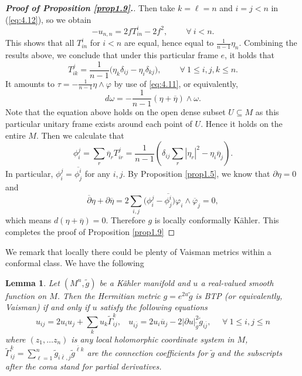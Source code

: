 \documentclass{amsart}
\numberwithin{equation}{section}
\newtheorem{lemma}  [theorem]     {Lemma}
\theoremstyle{definition}
\renewcommand{\1}{\mathds{1}}
\renewcommand{\>}{\rightarrow}
\begin{document}
\begin{proof}[{\bf Proof of Proposition \ref{prop1.9}.}]
Then take $k=\ell =n$ and $i=j<n$ in (\ref{eq:4.12}), so we obtain
$$ -u_{n,n}= 2f T^i_{in} - 2f ^2,\qquad \ \forall \ i<n.$$
This shows that all $T^i_{in}$ for $i<n$ are equal, hence equal to $\frac{1}{n-1}\eta_n$.
Combining the results above, we conclude that under this particular frame $e$, it holds that
\begin{equation}
T^j_{ik} = \frac{1}{n-1} \big( \eta_k \delta_{ij} - \eta_i \delta_{kj}  \big),\qquad  \ \forall \ 1\leq i,j,k\leq n.   \label{eq:4.14}
\end{equation}
It amounts to $\tau= -\frac{1}{n-1} \eta \wedge \varphi$ by use of \eqref{eq:4.11}, or equivalently,
\[d \omega = -\frac{1}{n-1}(\eta + \overline{\eta}) \wedge \omega.\]
Note that the equation above holds on the open dense subset $U\subseteq M$ as this particular unitary frame exists around each point of $U$.
Hence it holds on the entire $M$. Then we calculate that
$$ \phi_i^j = \sum_r \overline{\eta}_r T^j_{ir} = \frac{1}{n-1}\left( \delta_{ij} \sum_r |\eta_r|^2 - \eta_i \overline{\eta}_j \right).$$
In particular, $\phi_i^j = \overline{\phi^i_j}$ for any $i,j$. By Proposition \ref{prop1.5}, we know that $\partial \eta =0$ and
$$ \overline{\partial }\eta + \partial \overline{\eta} = 2\sum_{i,j} \big( \phi_i^j - \overline{\phi^i_j}) \varphi_i\wedge \overline{\varphi}_j = 0,$$
which means $d(\eta + \overline{\eta}) =0$. Therefore $g$ is locally conformally K\"ahler. This completes the proof of Proposition \ref{prop1.9}
\end{proof}

We remark that locally there could be plenty of Vaisman metrics within a conformal class. We have the following

\begin{lemma}\label{LCK_VSM}
Let $(M^n,\tilde{g})$ be a K\"ahler manifold and $u$ a real-valued smooth function on $M$. Then the Hermitian metric $g=e^{2u}\tilde{g}$ is BTP (or equivalently, Vaisman) if and only if $u$ satisfy the following equations
\begin{equation} \label{eq:localVaisman}
 u_{ij} = 2u_iu_j + \sum_k u_k \tilde{\Gamma}^k_{ij}, \ \ \ \ u_{i\bar{j}}=2u_i\overline{u}_j - 2 |\partial u|^2_{\tilde{g}} \tilde{g}_{i\bar{j}}, \ \ \ \ \ \ \forall \ 1\leq i,j\leq n
 \end{equation}
where $(z_1, \ldots  z_n)$ is any local holomorphic coordinate system in $M$, $ \tilde{\Gamma}^k_{ij} = \sum_{\ell =1}^n \tilde{g}_{i\bar{\ell},j} \tilde{g}^{\bar{\ell}k}$ are the connection coefficients for $\tilde{g}$ and the subscripts after the coma stand for partial derivatives.
\end{lemma}
\end{document}
